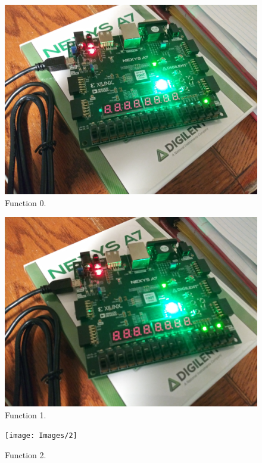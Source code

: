 \documentclass{article}
\begin{document}
\begin{figure}[H]
    \centering
    \includegraphics[width=\textwidth]{Images/0}
    \caption{Function 0.}
    \label{pic:func0}
\end{figure}

\begin{figure}[H]
    \centering
    \includegraphics[width=\textwidth]{Images/1}
    \caption{Function 1.}
    \label{pic:func1}
\end{figure}

\begin{figure}[H]
    \centering
    \texttt{[image: Images/2]}
    \caption{Function 2.}
    \label{pic:func2}
\end{figure}
\end{document}
